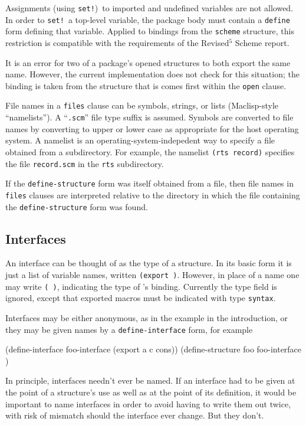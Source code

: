 Assignments (using {\tt set!})\ to imported and undefined variables
are not allowed.  In order to {\tt set!}\ a top-level variable, the
package body must contain a {\tt define} form defining that variable.
Applied to bindings from the {\tt scheme} structure, this restriction
is compatible with the requirements of the Revised$^5$ Scheme report.

It is an error for two of a package's opened structures to both export
the same name.  However, the current implementation does not check for
this situation; the binding is taken from the structure that is comes
first within the {\tt open} clause.

File names in a {\tt files} clause can be symbols, strings, or lists
(Maclisp-style ``namelists'').  A ``{\tt.scm}'' file type suffix is
assumed.  Symbols are converted to file names by converting to upper
or lower case as appropriate for the host operating system.  A
namelist is an operating-system-indepedent way to specify a file
obtained from a subdirectory.  For example, the namelist {\tt(rts
record)} specifies the file {\tt record.scm} in the {\tt rts}
subdirectory.

If the {\tt define-structure} form was itself obtained from a file, then
file names in {\tt files} clauses are interpreted relative to the
directory in which the file containing the {\tt define-structure} form
was found.


\subsection*{Interfaces}

An interface can be thought of as the type of a structure.  In its
basic form it is just a list of variable names, written {\tt(export
 \etc)}.  However, in place of
a name one may write {\tt( )}, indicating the type
of 's binding.  Currently the type field is ignored, except
that exported macros must be indicated with type {\tt syntax}.

Interfaces may be either anonymous, as in the example in the
introduction, or they may be given names by a {\tt define-interface}
form, for example
\begin{code}
    (define-interface foo-interface (export a c cons))
    (define-structure foo foo-interface \etc)
\end{code}
In principle, interfaces needn't ever be named.  If an interface
had to be given at the point of a structure's use as well as at the
point of its definition, it would be important to name interfaces in
order to avoid having to write them out twice, with risk of mismatch
should the interface ever change.  But they don't.

